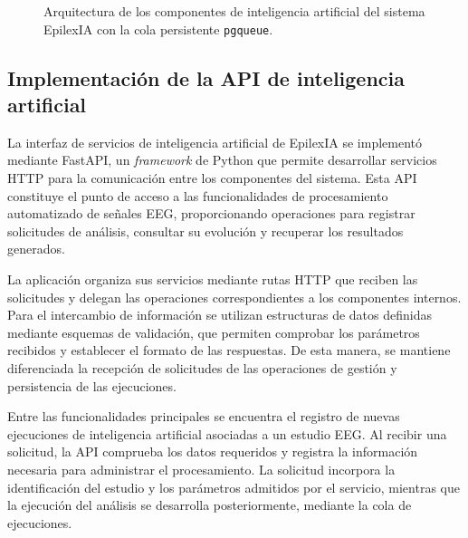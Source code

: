 \begin{figure}[p]

    \caption{Arquitectura de los componentes de
inteligencia artificial del sistema EpilexIA
con la cola persistente \texttt{pgqueue}.}

    \label{fig:arquitectura-componentes-ia}
\end{figure}

\FloatBarrier


\subsection{Implementación de la API de inteligencia artificial}

La interfaz de servicios de inteligencia artificial
de EpilexIA se implementó mediante FastAPI, un
\textit{framework} de Python que permite desarrollar
servicios HTTP para la comunicación entre los
componentes del sistema. Esta API constituye
el punto de acceso a las funcionalidades de
procesamiento automatizado de señales EEG,
proporcionando operaciones para registrar
solicitudes de análisis, consultar su evolución
y recuperar los resultados generados.

La aplicación organiza sus servicios mediante
rutas HTTP que reciben las solicitudes y
delegan las operaciones correspondientes a
los componentes internos. Para el intercambio
de información se utilizan estructuras de
datos definidas mediante esquemas de validación,
que permiten comprobar los parámetros recibidos
y establecer el formato de las respuestas.
De esta manera, se mantiene diferenciada
la recepción de solicitudes de las operaciones
de gestión y persistencia de las ejecuciones.

Entre las funcionalidades principales se
encuentra el registro de nuevas ejecuciones
de inteligencia artificial asociadas a un
estudio EEG. Al recibir una solicitud, la API
comprueba los datos requeridos y registra
la información necesaria para administrar
el procesamiento. La solicitud incorpora
la identificación del estudio y los parámetros
admitidos por el servicio, mientras que
la ejecución del análisis se desarrolla
posteriormente, mediante la cola de ejecuciones.

